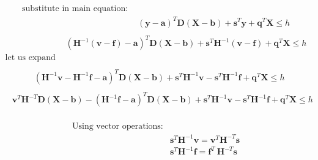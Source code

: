 \documentclass[12pt]{article}
\begin{document}
\begin{equation}
\begin{aligned}
\text{substitute in main equation: }\\
& (\mathbf{y}-\mathbf{a})^T \mathbf{D} (\mathbf{X}-\mathbf{b}) + \mathbf{s}^T \mathbf{y} + \mathbf{q}^T \mathbf{X} \leq h  \\
\end{aligned}
\end{equation}
\begin{equation}
\begin{aligned}
& ( \mathbf{H}^{-1} (\mathbf{v} - \mathbf{f})-\mathbf{a})^T \mathbf{D} (\mathbf{X}-\mathbf{b})+ \mathbf{s}^T  \mathbf{H}^{-1} (\mathbf{v} - \mathbf{f}) + \mathbf{q}^T \mathbf{X} \leq h  \\
\text{let us expand the equation:}\\
\end{aligned}
\end{equation}
\begin{equation}
\begin{aligned}
& ( \mathbf{H}^{-1} \mathbf{v} - \mathbf{H}^{-1} \mathbf{f}-\mathbf{a})^T \mathbf{D} (\mathbf{X}-\mathbf{b})+ \mathbf{s}^T  \mathbf{H}^{-1} \mathbf{v} - \mathbf{s}^T\mathbf{H}^{-1} \mathbf{f} + \mathbf{q}^T \mathbf{X} \leq h  \\
\end{aligned}
\end{equation}
\begin{equation}
\begin{aligned}
& \mathbf{v}^T \mathbf{H}^{-T} \mathbf{D} (\mathbf{X}-\mathbf{b}) - (\mathbf{H}^{-1} \mathbf{f}-\mathbf{a})^T \mathbf{D} (\mathbf{X}-\mathbf{b})+ \mathbf{s}^T  \mathbf{H}^{-1} \mathbf{v} - \mathbf{s}^T\mathbf{H}^{-1} \mathbf{f} + \mathbf{q}^T \mathbf{X} \leq h  \\
\end{aligned}
\end{equation}


\begin{equation}
\begin{aligned}
\text{Using vector operations:}\\
& \mathbf{s}^T  \mathbf{H}^{-1} \mathbf{v} = \mathbf{v}^T\mathbf{H}^{-T}\mathbf{s} \\
& \mathbf{s}^T\mathbf{H}^{-1} \mathbf{f} = \mathbf{f}^T\ \mathbf{H}^{-T}\mathbf{s} \\
\end{aligned}
\end{equation}
\end{document}
